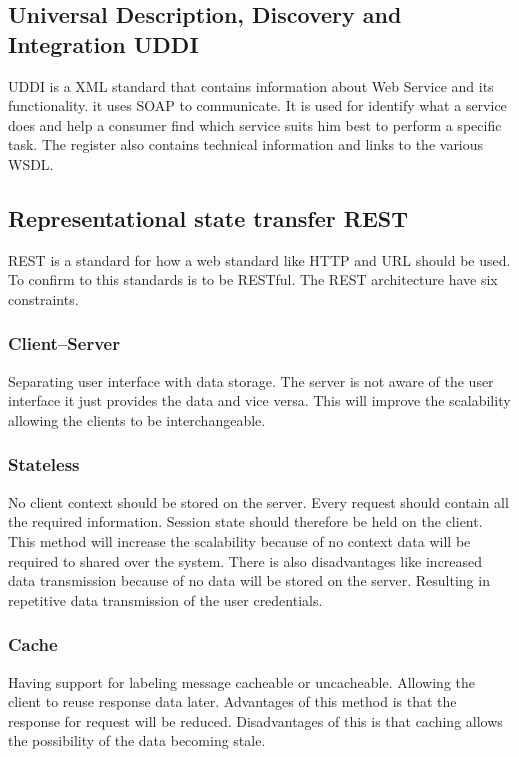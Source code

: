 \documentclass{llncs}
\begin{document}
\subsection{Universal Description, Discovery and Integration UDDI}
UDDI is a XML standard that contains information about Web Service and its functionality. it uses SOAP to communicate. It is used for identify what a service does and help a consumer find which service suits him best to perform a specific task. The register also contains technical information and links to the various WSDL.

\subsection{Representational state transfer REST}
REST is a standard for how a web standard like HTTP and URL should be used. To confirm to this standards is to be RESTful. The REST architecture have six constraints.

\subsubsection{Client–Server}
Separating user interface with data storage. The server is not aware of the user interface it just provides the data and vice versa. This will improve the scalability allowing the clients to be interchangeable.

\subsubsection{Stateless}
No client context should be stored on the server. Every request should contain all the required information. Session state should therefore be held on the client. This method will increase the scalability because of no context data will be required to shared over the system. There is also disadvantages like increased data transmission because of no data will be stored on the server. Resulting in repetitive data transmission of the user credentials.

\subsubsection{Cache}
Having support for labeling message cacheable or uncacheable. Allowing the client  to reuse response data later. Advantages of this method is that the response for request will be reduced. Disadvantages of this is that caching allows the possibility of the data becoming stale.
\end{document}
